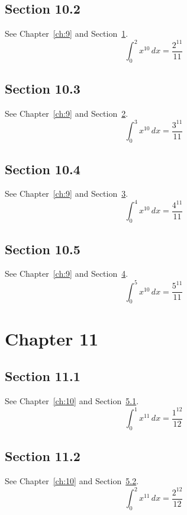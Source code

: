 \documentclass{book}
\begin{document}
\section{Section 10.2}\label{sec:10-2}
See Chapter~\ref{ch:9} and Section~\ref{sec:10-2}.
\lipsum[53-55]
\begin{equation}\label{eq:10-2} \int_0^{2} x^{10}\,dx = \frac{2^{11}}{11}\end{equation}
\section{Section 10.3}\label{sec:10-3}
See Chapter~\ref{ch:9} and Section~\ref{sec:10-3}.
\lipsum[54-56]
\begin{equation}\label{eq:10-3} \int_0^{3} x^{10}\,dx = \frac{3^{11}}{11}\end{equation}
\section{Section 10.4}\label{sec:10-4}
See Chapter~\ref{ch:9} and Section~\ref{sec:10-4}.
\lipsum[55-57]
\begin{equation}\label{eq:10-4} \int_0^{4} x^{10}\,dx = \frac{4^{11}}{11}\end{equation}
\section{Section 10.5}\label{sec:10-5}
See Chapter~\ref{ch:9} and Section~\ref{sec:10-5}.
\lipsum[56-58]
\begin{equation}\label{eq:10-5} \int_0^{5} x^{10}\,dx = \frac{5^{11}}{11}\end{equation}
\chapter{Chapter 11}\label{ch:11}
\section{Section 11.1}\label{sec:11-1}
See Chapter~\ref{ch:10} and Section~\ref{sec:11-1}.
\lipsum[57-59]
\begin{equation}\label{eq:11-1} \int_0^{1} x^{11}\,dx = \frac{1^{12}}{12}\end{equation}
\section{Section 11.2}\label{sec:11-2}
See Chapter~\ref{ch:10} and Section~\ref{sec:11-2}.
\lipsum[58-60]
\begin{equation}\label{eq:11-2} \int_0^{2} x^{11}\,dx = \frac{2^{12}}{12}\end{equation}
\end{document}
